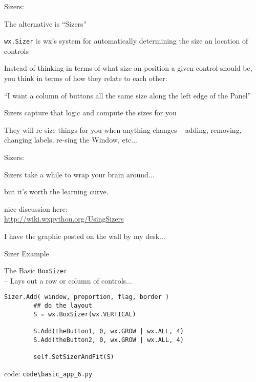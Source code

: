 \documentclass{beamer}
\begin{document}
\begin{frame}[fragile]{Sizers:}

{\Large The alternative is ``Sizers''}

\vfill
{\large \verb`wx.Sizer` is wx's system for automatically determining the size an location of controls}

\vfill
{\large Instead of thinking in terms of what size an position a given control should be, you think in terms of how they relate to each other:}

\vfill
{\large ``I want a column of buttons all the same size along the left edge of the Panel''}

\vfill
{\large Sizers capture that logic and compute the sizes for you}

\vfill
{\large They will re-size things for you when anything changes -- adding, removing, changing labels, re-sing the Window, etc...}

\end{frame}


\begin{frame}[fragile]{Sizers:}

{\Large Sizers take a while to wrap your brain around...}

\vfill
{\large but it's worth the learning curve.}


\vfill
{\large nice discussion here:\\
\url{http://wiki.wxpython.org/UsingSizers} }

\vfill
{I have the graphic posted on the wall by my desk...}

\end{frame}

\begin{frame}[fragile]{Sizer Example}

{\Large The Basic \verb`BoxSizer`}\\
{\large  -- Lays out a row or column of controls...}

\vfill
\begin{verbatim}
Sizer.Add( window, proportion, flag, border )
        ## do the layout
        S = wx.BoxSizer(wx.VERTICAL)
        
        S.Add(theButton1, 0, wx.GROW | wx.ALL, 4)
        S.Add(theButton2, 0, wx.GROW | wx.ALL, 4)
        
        self.SetSizerAndFit(S)
\end{verbatim}
\vfill
code: \verb`code\basic_app_6.py`
\end{frame}
\end{document}
